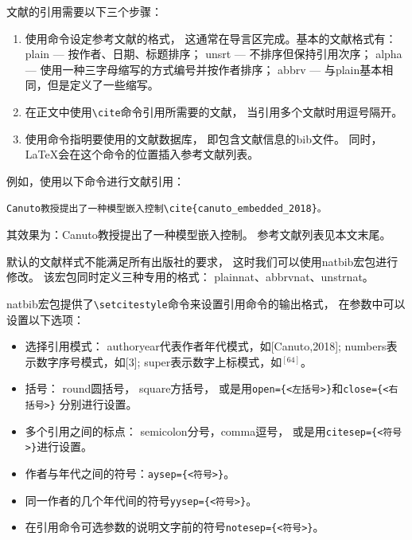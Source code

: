 \documentclass{ctexart}
\numberwithin{equation}{section}			%
\begin{document}
	文献的引用需要以下三个步骤：
	
	\begin{enumerate}
		\item 使用\verb||命令设定参考文献的格式，
		这通常在导言区完成。基本的文献格式有：
		plain --- 按作者、日期、标题排序；
		unsrt --- 不排序但保持引用次序；
		alpha --- 使用一种三字母缩写的方式编号并按作者排序；
		abbrv --- 与plain基本相同，但是定义了一些缩写。
		
		\item 在正文中使用\verb|\cite|命令引用所需要的文献，
		当引用多个文献时用逗号隔开。
		
		\item 使用\verb||命令指明要使用的文献数据库，
		即包含文献信息的bib文件。
		同时， \LaTeX 会在这个命令的位置插入参考文献列表。
	\end{enumerate}

	例如，使用以下命令进行文献引用：

\begin{lstlisting}
Canuto教授提出了一种模型嵌入控制\cite{canuto_embedded_2018}。
\end{lstlisting}
	
	其效果为：Canuto教授提出了一种模型嵌入控制\cite{canuto_embedded_2018}。
	参考文献列表见本文末尾。
	
	默认的文献样式不能满足所有出版社的要求，
	这时我们可以使用natbib宏包进行修改。
	该宏包同时定义三种专用的格式：
	plainnat、abbrvnat、unstrnat。
	
	natbib宏包提供了\verb|\setcitestyle|命令来设置引用命令的输出格式，
	在参数中可以设置以下选项：
	
	\begin{itemize}
		\item 选择引用模式：
		authoryear代表作者年代模式，如[Canuto,2018];
		numbers表示数字序号模式，如[3];
		super表示数字上标模式，如${}^{[64]}$。
		
		\item 括号：
		round圆括号，
		square方括号，
		或是用\verb|open={<左括号>}|和\verb|close={<右括号>}|
		分别进行设置。
		
		\item 多个引用之间的标点：
		semicolon分号，comma逗号，
		或是用\verb|citesep={<符号>}|进行设置。
		
		\item 作者与年代之间的符号：\verb|aysep={<符号>}|。
		
		\item 同一作者的几个年代间的符号\verb|yysep={<符号>}|。
		
		\item 在引用命令可选参数的说明文字前的符号\verb|notesep={<符号>}|。
	\end{itemize}
\end{document}
